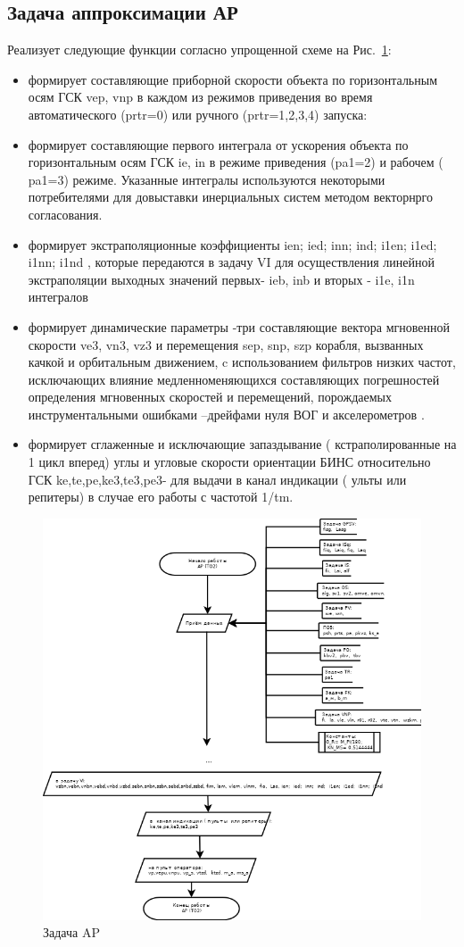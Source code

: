 \subsection{Задача аппроксимации АР}
Реализует следующие функции согласно упрощенной схеме на Рис.~\ref{fig:AP}:
\begin{itemize}
    \item формирует  составляющие приборной скорости  объекта  по  горизонтальным  осям ГСК  vep, vnp  в  каждом из режимов  приведения  во  время  
    автоматического  (prtr=0)  или ручного (prtr=1,2,3,4)   запуска:
    \item формирует  составляющие  первого  интеграла   от   ускорения    объекта  по  горизонтальным  осям   ГСК   ie,  in   в   режиме   
    приведения  (pa1=2)   и    рабочем ( pa1=3)    режиме.  Указанные интегралы используются  некоторыми   потребителями  для  довыставки 
    инерциальных  систем  методом векторнрго согласования.
    \item формирует   экстраполяционные  коэффициенты   ien;  ied;  inn;  ind;  i1en;  i1ed;  i1nn;  i1nd  ,  
    которые  передаются  в  задачу   VI  для  осуществления  линейной  экстраполяции    выходных  значений   первых-    ieb,    inb  и  
    вторых -   i1e,  i1n  интегралов  
    \item формирует динамические  параметры -три составляющие вектора мгновенной скорости ve3,  vn3,  vz3  и перемещения sep,   snp,   szp  корабля, 
    вызванных качкой и орбитальным движением, c использованием  фильтров  низких частот,  исключающих влияние медленноменяющихся составляющих  
    погрешностей   определения мгновенных скоростей и перемещений, порождаемых  инструментальными ошибками –дрейфами нуля ВОГ и акселерометров  .
    \item формирует сглаженные и исключающие запаздывание ( кстраполированные на 1 цикл вперед) углы и угловые скорости ориентации БИНС  
    относительно ГСК  ke,te,pe,ke3,te3,pe3- для  выдачи в  канал индикации ( ульты  или репитеры)  в случае  его работы с частотой 1/tm. 
\end{itemize}
\begin{figure}[H]
    \centering
    \includegraphics[width=0.75\linewidth]{images/AP_simple.png}
    \caption{Задача AP}
    \label{fig:AP}
\end{figure}
